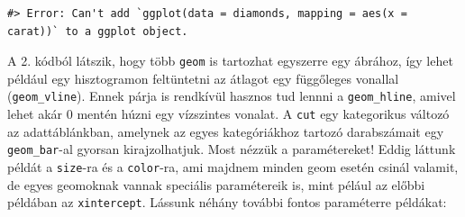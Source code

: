 \documentclass[
]{article}
\newenvironment{Shaded}{\begin{snugshade}}{\end{snugshade}}
\newcommand{\AttributeTok}[1]{\textcolor[rgb]{0.77,0.63,0.00}{#1}}
\newcommand{\FunctionTok}[1]{\textcolor[rgb]{0.00,0.00,0.00}{#1}}
\newcommand{\NormalTok}[1]{#1}
\newcommand{\SpecialCharTok}[1]{\textcolor[rgb]{0.00,0.00,0.00}{#1}}
\newcommand{\StringTok}[1]{\textcolor[rgb]{0.31,0.60,0.02}{#1}}
\begin{document}
\begin{Shaded}
\end{Shaded}

\begin{verbatim}
#> Error: Can't add `ggplot(data = diamonds, mapping = aes(x = carat))` to a ggplot object.
\end{verbatim}

A 2. kódból látszik, hogy több \texttt{geom} is tartozhat egyszerre egy ábrához, így lehet például egy hisztogramon feltüntetni az átlagot egy függőleges vonallal (\texttt{geom\_vline}). Ennek párja is rendkívül hasznos tud lennni a \texttt{geom\_hline}, amivel lehet akár 0 mentén húzni egy vízszintes vonalat. A \texttt{cut} egy kategorikus változó az adattáblánkban, amelynek az egyes kategóriákhoz tartozó darabszámait egy \texttt{geom\_bar}-al gyorsan kirajzolhatjuk.
Most nézzük a paramétereket! Eddig láttunk példát a \texttt{size}-ra és a \texttt{color}-ra, ami majdnem minden geom esetén csinál valamit, de egyes geomoknak vannak speciális paramétereik is, mint pélául az előbbi példában az \texttt{xintercept}. Lássunk néhány további fontos paraméterre példákat:
\end{document}
